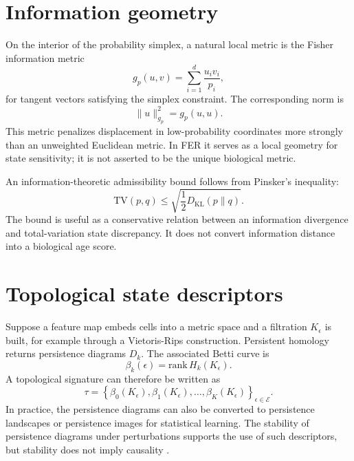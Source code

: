 \documentclass[11pt]{article}
\newcommand{\TV}{\mathrm{TV}}
\newcommand{\KL}{D_{\mathrm{KL}}}
\begin{document}
\section{Information geometry}
On the interior of the probability simplex, a natural local metric is the Fisher information metric
\begin{equation}
 g_p(u,v)=\sum_{i=1}^{d}\frac{u_i v_i}{p_i},
\label{eq:fisher}
\end{equation}
for tangent vectors satisfying the simplex constraint. The corresponding norm is
\begin{equation}
 \|u\|_{g_p}^2 = g_p(u,u).
\label{eq:fishernorm}
\end{equation}
This metric penalizes displacement in low-probability coordinates more strongly than an unweighted Euclidean metric. In FER it serves as a local geometry for state sensitivity; it is not asserted to be the unique biological metric.

An information-theoretic admissibility bound follows from Pinsker's inequality:
\begin{equation}
 \TV(p,q) \leq \sqrt{\frac{1}{2}\KL(p\|q)}.
\label{eq:pinsker}
\end{equation}
The bound is useful as a conservative relation between an information divergence and total-variation state discrepancy. It does not convert information distance into a biological age score.

\section{Topological state descriptors}
Suppose a feature map embeds cells into a metric space and a filtration $K_\epsilon$ is built, for example through a Vietoris-Rips construction. Persistent homology returns persistence diagrams $D_k$. The associated Betti curve is
\begin{equation}
 \beta_k(\epsilon)=\mathrm{rank}\,H_k(K_\epsilon).
\label{eq:betti}
\end{equation}
A topological signature can therefore be written as
\begin{equation}
 \tau = \left\{\beta_0(K_\epsilon),\beta_1(K_\epsilon),\ldots,\beta_K(K_\epsilon)\right\}_{\epsilon\in\mathcal E}.
\label{eq:tau}
\end{equation}
In practice, the persistence diagrams can also be converted to persistence landscapes or persistence images for statistical learning. The stability of persistence diagrams under perturbations supports the use of such descriptors, but stability does not imply causality \cite{cohensteiner2007}.
\end{document}
